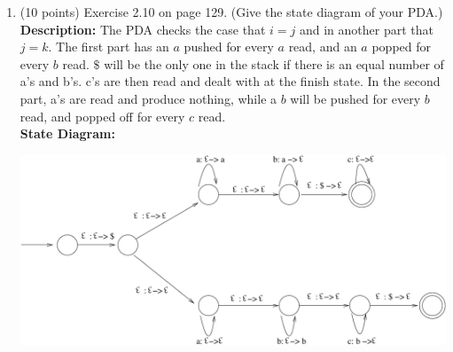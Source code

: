 \documentclass[11pt]{article}
\begin{document}
\begin{enumerate}
  \item (10 points) Exercise 2.10 on page 129. (Give the state diagram of your PDA.) \\
    {\bf Description:} The PDA checks the case that $i = j$ and in another part that $j = k$. The first part has
    an $a$ pushed for every $a$ read, and an $a$ popped for every $b$ read. $\$$ will be the only one in
    the stack if there is an equal number of a's and b's. c's are then read and dealt with at the finish state.
    In the second part, a's are read and produce nothing, while a $b$ will be pushed for every $b$ read, and popped
    off for every $c$ read. \\
    {\bf State Diagram:}
    \begin{center}
      \includegraphics[scale=.7] {fig1.pdf}
    \end{center}
\end{enumerate}
\end{document}
